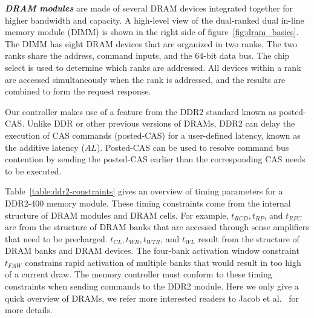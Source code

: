 \textbf{\emph{DRAM modules}} are made of several DRAM devices integrated together for higher bandwidth and capacity. 
A high-level view of the dual-ranked dual in-line memory module (DIMM) is shown in the right side of figure~\ref{fig:dram_basics}.
The DIMM has eight DRAM devices that are organized in two ranks.
The two ranks share the address, command inputs, and the 64-bit data bus.
The chip select is used to determine which ranks are addressed.
All devices within a rank are accessed simultaneously when the rank is addressed, and the results are combined to form the request response.  

Our controller makes use of a feature from the DDR2 standard known as posted-CAS.  
Unlike DDR or other previous versions of DRAMs, DDR2 can delay the execution of CAS commands (posted-CAS) for a user-defined latency, known as the additive latency ($AL$). 
Posted-CAS can be used to resolve command bus contention by sending the posted-CAS earlier than the corresponding CAS needs to be executed.

Table~\ref{table:ddr2-constraints} gives an overview of timing parameters for a DDR2-400 memory module.
These timing constraints come from the internal structure of DRAM modules and DRAM cells.
For example, $t_{RCD}, t_{RP}$, and $t_{RFC}$ are from the structure of DRAM banks that are accessed through sense amplifiers that need to be precharged.
$t_{CL}, t_{WR}, t_{WTR}$, and $t_{WL}$ result from the structure of DRAM banks and DRAM devices.
The four-bank activation window constraint $t_{FAW}$ constrains rapid activation of multiple banks that would result in too high of a current draw.
The memory controller must conform to these timing constraints when sending commands to the DDR2 module.  
Here we only give a quick overview of DRAMs, we refer more interested readers to Jacob et al.~\cite{JaNgWa07} for more details.

